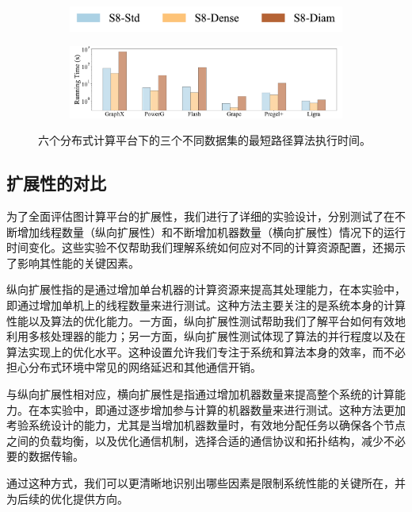 \begin{figure}[h]\centering
    \begin{subfigure}[b]{0.7\textwidth}
        \includegraphics[width=\textwidth]{figures/legend_horizontal.pdf}
    \end{subfigure}

    \begin{subfigure}[b]{0.8\textwidth}
		\includegraphics[width=\textwidth]{figures/algorithm-sensitivity-SSSP.pdf}
	\end{subfigure}
    \caption{六个分布式计算平台下的三个不同数据集的最短路径算法执行时间。}
    \label{C9-fig1}
\end{figure}

\subsection{扩展性的对比}

为了全面评估图计算平台的扩展性，我们进行了详细的实验设计，分别测试了在不断增加线程数量（纵向扩展性）和不断增加机器数量（横向扩展性）情况下的运行时间变化。这些实验不仅帮助我们理解系统如何应对不同的计算资源配置，还揭示了影响其性能的关键因素。

纵向扩展性指的是通过增加单台机器的计算资源来提高其处理能力，在本实验中，即通过增加单机上的线程数量来进行测试。这种方法主要关注的是系统本身的计算性能以及算法的优化能力。一方面，纵向扩展性测试帮助我们了解平台如何有效地利用多核处理器的能力；另一方面，纵向扩展性测试体现了算法的并行程度以及在算法实现上的优化水平。这种设置允许我们专注于系统和算法本身的效率，而不必担心分布式环境中常见的网络延迟和其他通信开销。

与纵向扩展性相对应，横向扩展性是指通过增加机器数量来提高整个系统的计算能力。在本实验中，即通过逐步增加参与计算的机器数量来进行测试。这种方法更加考验系统设计的能力，尤其是当增加机器数量时，有效地分配任务以确保各个节点之间的负载均衡，以及优化通信机制，选择合适的通信协议和拓扑结构，减少不必要的数据传输。

通过这种方式，我们可以更清晰地识别出哪些因素是限制系统性能的关键所在，并为后续的优化提供方向。

